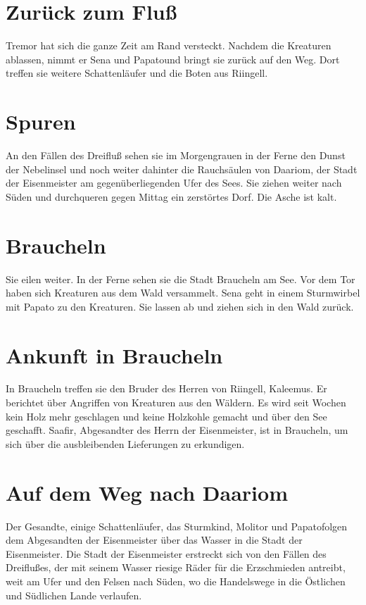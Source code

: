 \documentclass[12pt,a4paper,onecolumn,twoside,ngerman]{book}
\newcommand{\Molitor}{Molitor}
\newcommand{\Sena}{Sena}
\newcommand{\Sturmkind}{Sturmkind}
\newcommand{\Papato}{Papato}
\newcommand{\Schattenlaufer}{Schattenläufer}
\newcommand{\Tremor}{Tremor}
\newcommand{\Rhingell}{Riingell}
\newcommand{\Kalemus}{Kaleemus}
\newcommand{\Dreifluss}{Dreifluß}
\newcommand{\Braucheln}{Braucheln}
\newcommand{\Eisenmeister}{Eisenmeister}
\newcommand{\Dariom}{Daariom}
\newcommand{\Safir}{Saafir}
\begin{document}
{\section{Zurück zum Fluß}
{\Tremor} hat sich die ganze Zeit am Rand versteckt. Nachdem die Kreaturen ablassen, nimmt er {\Sena} und \Papato  und bringt sie zurück auf den Weg. Dort treffen sie weitere {\Schattenlaufer} und die Boten aus {\Rhingell}.

\section{Spuren}
An den Fällen des {\Dreifluss} sehen sie im Morgengrauen in der Ferne den Dunst der Nebelinsel und noch weiter dahinter die Rauchsäulen von {\Dariom}, der Stadt der {\Eisenmeister} am gegenüberliegenden Ufer des Sees.\linebreak
Sie ziehen weiter nach Süden und durchqueren gegen Mittag ein zerstörtes Dorf. Die Asche ist kalt.

\section{\Braucheln}
Sie eilen weiter. In der Ferne sehen sie die Stadt {\Braucheln} am See. Vor dem Tor haben sich Kreaturen aus dem Wald versammelt. {\Sena} geht in einem Sturmwirbel mit {\Papato} zu den Kreaturen. Sie lassen ab und ziehen sich in den Wald zurück.

\section{Ankunft in {\Braucheln}}
In {\Braucheln} treffen sie den Bruder des Herren von {\Rhingell}, {\Kalemus}. Er berichtet über Angriffen von Kreaturen aus den Wäldern. Es wird seit Wochen kein Holz mehr geschlagen und keine Holzkohle gemacht und über den See geschafft. {\Safir}, Abgesandter des Herrn der {\Eisenmeister}, ist in {\Braucheln}, um sich über die ausbleibenden Lieferungen zu erkundigen.

\section{Auf dem Weg nach \Dariom}
Der Gesandte, einige {\Schattenlaufer}, das {\Sturmkind}, {\Molitor} und \Papato folgen dem Abgesandten der {\Eisenmeister} über das Wasser in die Stadt der {\Eisenmeister}.\linebreak
Die Stadt der {\Eisenmeister} erstreckt sich von den Fällen des {\Dreifluss}es, der mit seinem Wasser riesige Räder für die Erzschmieden antreibt, weit am Ufer und den Felsen nach Süden, wo die Handelswege in die Östlichen und Südlichen Lande verlaufen.

}
\end{document}
